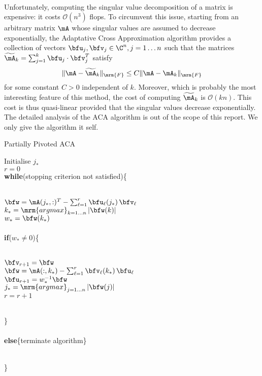 \quad\\
Unfortunately, computing the singular value 
decomposition  of a matrix is expensive: it costs $\mathcal{O}(n^{3})$ flops. To circumvent this issue, starting from 
an arbitrary matrix $\mA$ whose singular values are assumed to decrease exponentially, the Adaptative 
Cross Approximation algorithm provides a collection of vectors $\bfu_{j},\bfv_{j}\in \C^{n}, j=1\dots n$ such that 
the matrices $\widetilde{\mA}_{k} = \sum_{j=1}^{k}\bfu_{j}\cdot\bfv_{j}^{T}$ satisfy 
$$
\Vert \mA - \widetilde{\mA}_{k}\Vert_{\mrm{F}}\leq C \Vert \mA - \mA_{k}\Vert_{\mrm{F}}
$$
for some constant $C>0$ independent of $k$. Moreover, which is probably the most interesting feature of this method, 
the cost of computing $\widetilde{\mA}_{k}$ is $\mathcal{O}(kn)$. This cost is thus quasi-linear provided that the singular 
values  decrease exponentially. The detailed analysis of the ACA algorithm is out of the scope of this report. We only 
give the algorithm it self.

\begin{algorithm}
  \caption{Partially Pivoted ACA}
  Initialise $j_{*}$\\
  $r=0$\\
  \textbf{while}(stopping criterion not satisfied)\{\\\quad\\
  \indent\hspace{0.5cm} \parbox{\linewidth}{
    $\bfw = \mA(j_{*},:)^{T} - \sum_{\ell=1}^{r}\bfu_{\ell}(j_{*})\,\bfv_{\ell}$\\
    $k_{*} = \mathop{\mrm{argmax}}_{k = 1\dots n}\vert \bfw(k)\vert$\\
    $w_{*} = \bfw(k_{*})$\\\quad\\
    \textbf{if}($w_{*}\neq 0$)\{\\\quad\\
    \indent\hspace{0.5cm} \parbox{\linewidth}{
      $\bfv_{r+1} = \bfw$\\
      $\bfw = \mA(:,k_{*})-\sum_{\ell = 1}^{r}\bfv_{\ell}(k_{*})\,\bfu_{\ell} $\\
      $\bfu_{r+1} = w_{*}^{-1}\bfw$\\      
      $j_{*} = \mathop{\mrm{argmax}}_{j = 1\dots n} \vert \bfw(j)\vert$\\
      $r=r+1$
    }
    \quad\\
    \}\\\quad\\
    \textbf{else}\{terminate algorithm\}
    }\\
  \}
\end{algorithm}







 